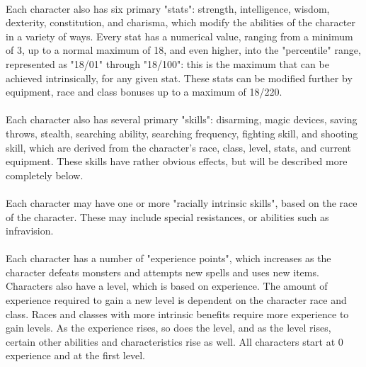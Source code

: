 \paragraph{}Each character also has six primary "stats": strength, intelligence,
wisdom, dexterity, constitution, and charisma, which modify the
abilities of the character in a variety of ways. Every stat has a
numerical value, ranging from a minimum of 3, up to a normal maximum of
18, and even higher, into the "percentile" range, represented as "18/01"
through "18/100": this is the maximum that can be achieved
intrinsically, for any given stat. These stats can be modified further
by equipment, race and class bonuses up to a maximum of 18/220.

\paragraph{}Each character also has several primary "skills": disarming, magic
devices, saving throws, stealth, searching ability, searching frequency,
fighting skill, and shooting skill, which are derived from the
character's race, class, level, stats, and current equipment. These
skills have rather obvious effects, but will be described more
completely below.

\paragraph{}Each character may have one or more "racially intrinsic skills", based
on the race of the character. These may include special resistances, or
abilities such as infravision.

\paragraph{}Each character has a number of "experience points", which increases as
the character defeats monsters and attempts new spells and uses new
items. Characters also have a level, which is based on experience. The
amount of experience required to gain a new level is dependent on the
character race and class. Races and classes with more intrinsic
benefits require more experience to gain levels. As the experience
rises, so does the level, and as the level rises, certain other
abilities and characteristics rise as well. All characters start at 0
experience and at the first level.

